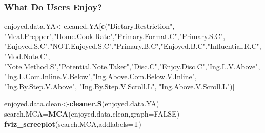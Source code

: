 \documentclass[
]{article}
\newenvironment{Shaded}{\begin{snugshade}}{\end{snugshade}}
\newcommand{\CommentTok}[1]{\textcolor[rgb]{0.56,0.35,0.01}{\textit{#1}}}
\newcommand{\DataTypeTok}[1]{\textcolor[rgb]{0.13,0.29,0.53}{#1}}
\newcommand{\KeywordTok}[1]{\textcolor[rgb]{0.13,0.29,0.53}{\textbf{#1}}}
\newcommand{\NormalTok}[1]{#1}
\newcommand{\OperatorTok}[1]{\textcolor[rgb]{0.81,0.36,0.00}{\textbf{#1}}}
\newcommand{\OtherTok}[1]{\textcolor[rgb]{0.56,0.35,0.01}{#1}}
\newcommand{\StringTok}[1]{\textcolor[rgb]{0.31,0.60,0.02}{#1}}
\begin{document}
\begin{Shaded}
\end{Shaded}

\hypertarget{what-do-users-enjoy-2}{%
\subsubsection{What Do Users Enjoy?}\label{what-do-users-enjoy-2}}

\begin{Shaded}
\begin{Highlighting}[]
\NormalTok{enjoyed.data.YA<-cleaned.YA[}\KeywordTok{c}\NormalTok{(}\StringTok{"Dietary.Restriction"}\NormalTok{, }\StringTok{"Meal.Prepper"}\NormalTok{,}\StringTok{"Home.Cook.Rate"}\NormalTok{,}\StringTok{"Primary.Format.C"}\NormalTok{,}\StringTok{"Primary.S.C"}\NormalTok{,}
            \StringTok{"Enjoyed.S.C"}\NormalTok{,}\StringTok{"NOT.Enjoyed.S.C"}\NormalTok{,}\StringTok{"Primary.B.C"}\NormalTok{,}\StringTok{"Enjoyed.B.C"}\NormalTok{,}\StringTok{"Influential.R.C"}\NormalTok{, }
            \StringTok{"Mod.Note.C"}\NormalTok{, }
            \StringTok{"Note.Method.S"}\NormalTok{,}\StringTok{"Potential.Note.Taker"}\NormalTok{,}\StringTok{"Disc.C"}\NormalTok{,}\StringTok{"Enjoy.Disc.C"}\NormalTok{,}\StringTok{"Ing.L.V.Above"}\NormalTok{,}
            \StringTok{"Ing.L.Com.Inline.V.Below"}\NormalTok{,}\StringTok{"Ing.Above.Com.Below.V.Inline"}\NormalTok{,  }\StringTok{"Ing.By.Step.V.Above"}\NormalTok{,  }\StringTok{"Ing.By.Step.V.Scroll.L"}\NormalTok{,}
            \StringTok{"Ing.Above.V.Scroll.L"}\NormalTok{)]}

\NormalTok{enjoyed.data.clean<-}\KeywordTok{cleaner.S}\NormalTok{(enjoyed.data.YA)}
\NormalTok{search.MCA=}\KeywordTok{MCA}\NormalTok{(enjoyed.data.clean,}\DataTypeTok{graph=}\OtherTok{FALSE}\NormalTok{)}
\KeywordTok{fviz_screeplot}\NormalTok{(search.MCA,}\DataTypeTok{addlabels=}\NormalTok{T)}
\end{Highlighting}
\end{Shaded}
\end{document}
